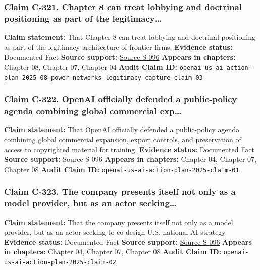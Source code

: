 \documentclass[
  american,
  11pt,
  letterpaper,
]{article}
\begin{document}
\subsubsection{Claim C-321. Chapter 8 can treat lobbying and doctrinal
positioning as part of the
legitimacy\ldots{}}\label{claim-c-321-chapter-8-can-treat-lobbying-and-doctrinal-positioning-as-part-of-the-legitimacy}

\textbf{Claim statement:} That Chapter 8 can treat lobbying and
doctrinal positioning as part of the legitimacy architecture of frontier
firms. \textbf{Evidence status:} Documented Fact \textbf{Source
support:}
\hyperref[source-s-096-openais-proposals-for-the-us-ai-action-plan]{Source
S-096} \textbf{Appears in chapters:} Chapter 08, Chapter 07, Chapter 04
\textbf{Audit Claim ID:}
\texttt{openai-us-ai-action-plan-2025-08-power-networks-legitimacy-capture-claim-03}

\subsubsection{Claim C-322. OpenAI officially defended a public-policy
agenda combining global commercial
exp\ldots{}}\label{claim-c-322-openai-officially-defended-a-public-policy-agenda-combining-global-commercial-exp}

\textbf{Claim statement:} That OpenAI officially defended a
public-policy agenda combining global commercial expansion, export
controls, and preservation of access to copyrighted material for
training. \textbf{Evidence status:} Documented Fact \textbf{Source
support:}
\hyperref[source-s-096-openais-proposals-for-the-us-ai-action-plan]{Source
S-096} \textbf{Appears in chapters:} Chapter 04, Chapter 07, Chapter 08
\textbf{Audit Claim ID:} \texttt{openai-us-ai-action-plan-2025-claim-01}

\subsubsection{Claim C-323. The company presents itself not only as a
model provider, but as an actor
seeking\ldots{}}\label{claim-c-323-the-company-presents-itself-not-only-as-a-model-provider-but-as-an-actor-seeking}

\textbf{Claim statement:} That the company presents itself not only as a
model provider, but as an actor seeking to co-design U.S. national AI
strategy. \textbf{Evidence status:} Documented Fact \textbf{Source
support:}
\hyperref[source-s-096-openais-proposals-for-the-us-ai-action-plan]{Source
S-096} \textbf{Appears in chapters:} Chapter 04, Chapter 07, Chapter 08
\textbf{Audit Claim ID:} \texttt{openai-us-ai-action-plan-2025-claim-02}
\end{document}
